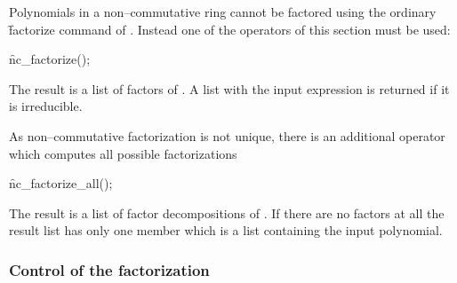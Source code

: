 \hypertarget{operator:NC_FACTORIZE}{}
Polynomials in a non--commutative ring cannot be factored
using the ordinary \f{factorize} command of {\REDUCE}.
Instead one of the operators of this section must be used:
\begin{syntax}
   \f{nc\_factorize}();
\end{syntax}
The result is a list of factors of . A list
with the input expression is returned if it is irreducible.

\hypertarget{operator:NC_FACTORIZE_ALL}{}
As non--commutative factorization is not unique, there is
an additional operator which computes all possible factorizations
\begin{syntax}
   \f{nc\_factorize\_all}();
\end{syntax}
The result is a list of factor decompositions of .
If there are no factors at all the result list has only one
member which is a list containing the input polynomial.

\subsubsection{Control of the factorization}

